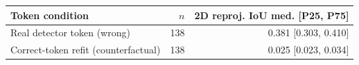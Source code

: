 \begin{tabular}{@{}lrr@{}}
\toprule
Token condition & $n$ & 2D reproj. IoU med. [P25, P75] \\
\midrule
Real detector token (wrong) & 138 & 0.381 [0.303, 0.410] \\
Correct-token refit (counterfactual) & 138 & 0.025 [0.023, 0.034] \\
\bottomrule
\end{tabular}
